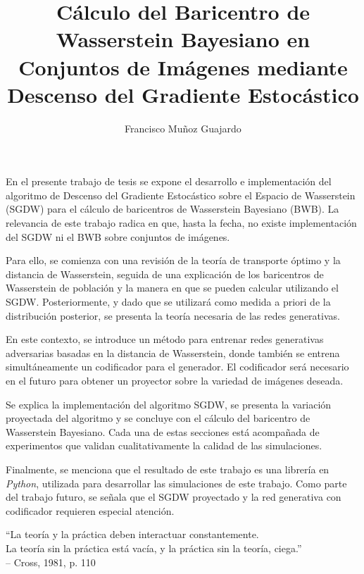 \documentclass[final]{umemoria}
\author{Francisco Muñoz Guajardo}
\title{Cálculo del Baricentro de Wasserstein Bayesiano en Conjuntos de Imágenes mediante Descenso del Gradiente Estocástico}
\begin{document}
% 

\frontmatter
\maketitle

\begin{resumen}
    En el presente trabajo de tesis se expone el desarrollo e implementación del algoritmo de Descenso del Gradiente Estocástico sobre el Espacio de Wasserstein (SGDW) para el cálculo de baricentros de Wasserstein Bayesiano (BWB). La relevancia de este trabajo radica en que, hasta la fecha, no existe implementación del SGDW ni el BWB sobre conjuntos de imágenes.

    Para ello, se comienza con una revisión de la teoría de transporte óptimo y la distancia de Wasserstein, seguida de una explicación de los baricentros de Wasserstein de población y la manera en que se pueden calcular utilizando el SGDW. Posteriormente, y dado que se utilizará como medida a priori de la distribución posterior, se presenta la teoría necesaria de las redes generativas.

    En este contexto, se introduce un método para entrenar redes generativas adversarias basadas en la distancia de Wasserstein, donde también se entrena simultáneamente un codificador para el generador. El codificador será necesario en el futuro para obtener un proyector sobre la variedad de imágenes deseada.

    Se explica la implementación del algoritmo SGDW, se presenta la variación proyectada del algoritmo y se concluye con el cálculo del baricentro de Wasserstein Bayesiano. Cada una de estas secciones está acompañada de experimentos que validan cualitativamente la calidad de las simulaciones.

    Finalmente, se menciona que el resultado de este trabajo es una librería en \textit{Python}, utilizada para desarrollar las simulaciones de este trabajo. Como parte del trabajo futuro, se señala que el SGDW proyectado y la red generativa con codificador requieren especial atención.

\end{resumen}


\begin{dedicatoria}
    ``La teoría y la práctica deben
    interactuar constantemente.\\
    La teoría sin la práctica está vacía,
    y la práctica sin la teoría, ciega.''\\
    -- Cross, 1981, p. 110
\end{dedicatoria}
\end{document}
